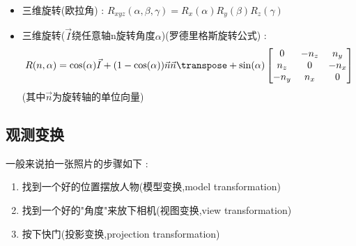 {{{\begin{itemize}
              $$
                R_y(\alpha) = \begin{bmatrix}
                  \cos\alpha  & 0 & \sin\alpha & 0 \\
                  0           & 1 & 0          & 0 \\
                  -\sin\alpha & 0 & \cos\alpha & 0 \\
                  0           & 0 & 0          & 1
                \end{bmatrix}
              $$

              $$
                R_z(\alpha) = \begin{bmatrix}
                  \cos\alpha & -\sin\alpha & 0 & 0 \\
                  \sin\alpha & \cos\alpha  & 0 & 0 \\
                  0          & 0           & 1 & 0 \\
                  0          & 0           & 0 & 1
                \end{bmatrix}
              $$
        \item 三维旋转(欧拉角) : $R_{xyz}(\alpha,\beta,\gamma) = R_x(\alpha)R_y(\beta)R_z(\gamma)$
        \item 三维旋转($\vec{I}$绕任意轴n旋转角度$\alpha$)(罗德里格斯旋转公式) : $$
                R(n,\alpha) = \cos(\alpha)\vec{I} + (1 - \cos(\alpha))\vec{n}\vec{n}\transpose + \sin(\alpha)\begin{bmatrix}
                  0    & -n_z & n_y  \\
                  n_z  & 0    & -n_x \\
                  -n_y & n_x  & 0
                \end{bmatrix}
              $$
              (其中$\vec{n}$为旋转轴的单位向量)
      \end{itemize}
    }%

    \subsection{观测变换}{
      一般来说拍一张照片的步骤如下 :

      \begin{enumerate}
        \item 找到一个好的位置摆放人物(模型变换,model transformation)
        \item 找到一个好的"角度"来放下相机(视图变换,view transformation)
        \item 按下快门(投影变换,projection transformation)
      \end{enumerate}

}}}
